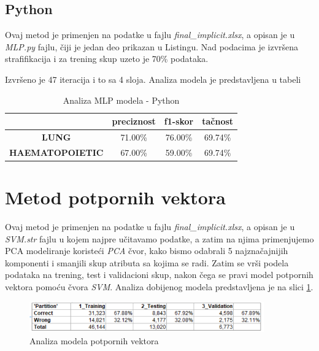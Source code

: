 \documentclass[a4paper]{article}
\begin{document}
\subsection{Python}

Ovaj metod je primenjen na podatke u fajlu \textit{final\_implicit.xlsx}, a opisan je u \textit{MLP.py} fajlu, čiji je jedan deo prikazan u Listingu. Nad podacima je izvršena strafifikacija i za trening skup uzeto je 70\% podataka.




Izvršeno je 47 iteracija i to sa 4 sloja. Analiza modela je predstavljena u tabeli
\begin{table}[ht!]
            \begin{center}
            \caption{Analiza MLP modela - Python}
            \label{tab:knn}
            \begin{tabular}{c|c|c|c} \hline
            & \textbf{preciznost} & \textbf{f1-skor} & \textbf{tačnost}\\ \hline
            \textbf{LUNG} & 71.00\% & 76.00\% & 69.74\%\\ \hline
            \textbf{HAEMATOPOIETIC} & 67.00\% & 59.00\% & 69.74\%\\ \hline
            \end{tabular}
            \end{center}
        \end{table}

\section{Metod potpornih vektora}
\label{sec:SVM}

Ovaj metod je primenjen na podatke u fajlu \textit{final\_implicit.xlsx}, a opisan je u \textit{SVM.str} fajlu u kojem najpre učitavamo podatke, a zatim na njima primenjujemo PCA modeliranje koristeći \textit{PCA} čvor, kako bismo odabrali 5 najznačajnijih komponenti i smanjili skup atributa sa kojima se radi. Zatim se vrši podela podataka na trening, test i validacioni skup, nakon čega se pravi model potpornih vektora pomoću čvora \textit{SVM}. Analiza dobijenog modela predstavljena je na slici \ref{fig:svm_an}.

\begin{figure}[ht!]
                \centering
                \includegraphics[width=0.9\textwidth]{SVM_analysis.PNG}
                \caption{Analiza modela potpornih vektora}
                \label{fig:svm_an}
            \end{figure}
            
\end{document}

